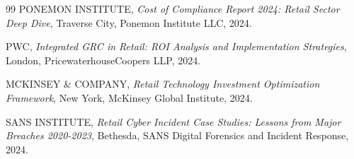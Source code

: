 \begin{thebibliography}{99}
 PONEMON INSTITUTE, \textit{Cost of Compliance Report 2024: Retail Sector Deep Dive}, Traverse City, Ponemon Institute LLC, 2024.

 PWC, \textit{Integrated GRC in Retail: ROI Analysis and Implementation Strategies}, London, PricewaterhouseCoopers LLP, 2024.

 MCKINSEY \& COMPANY, \textit{Retail Technology Investment Optimization Framework}, New York, McKinsey Global Institute, 2024.

 SANS INSTITUTE, \textit{Retail Cyber Incident Case Studies: Lessons from Major Breaches 2020-2023}, Bethesda, SANS Digital Forensics and Incident Response, 2024.
\end{thebibliography}